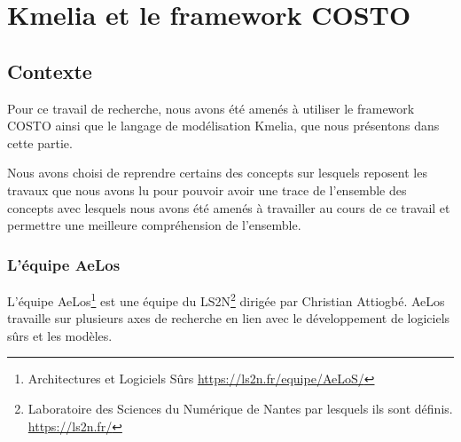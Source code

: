 \chapter{Kmelia et le framework COSTO}
\label{chap:KmeliaCOSTO}
\begin{comment}
    
    The main features of Kmelia are:
    
    component : a component is a container of services; it is described with a state space constrained by an invariant. A component is designed independently from its environment by setting assumptions such as virtual client components or required service specifications;
    
    service: a service describes a functionality; it is more than a simple operation; it has a pre-condition, a post-condition and a behaviour described with a labelled transition system (LTS). Moreover a service may hierarchically give access to other services. The behaviour supports communication interactions, dynamic evolution rules and service composition;
    
    assembly of components: an assembly is a set of components linked via their required and provided services with the aim to build effective functionality. Linking components by their services in assemblies establishes a possible bridge to Service Oriented Architectures. The component assemblies are governed by strict service composability rules;
    
    composite component: a composite component is a component that encapsulates assemblies or other components; it is subject to encapsulation and promotion policies.
\end{comment}


\section{Contexte}
\label{sec:contexte}
    Pour ce travail de recherche, nous avons été amenés à utiliser le framework COSTO ainsi que le langage de modélisation Kmelia, que nous présentons dans cette partie.

    Nous avons choisi de reprendre certains des concepts sur lesquels reposent les travaux que nous avons lu pour pouvoir avoir une trace de l'ensemble des concepts avec lesquels nous avons été amenés à travailler au cours de ce travail et permettre une meilleure compréhension de l'ensemble.
    

\subsection*{L’équipe AeLos}
    L'équipe AeLos\footnote{Architectures et Logiciels Sûrs \url{https://ls2n.fr/equipe/AeLoS/}} est une équipe du LS2N\footnote{Laboratoire des Sciences du Numérique de Nantes par lesquels ils sont définis. \url{https://ls2n.fr/}} dirigée par Christian Attiogbé. AeLos travaille sur plusieurs axes de recherche en lien avec le développement de logiciels sûrs et les modèles. 
\clearpage

